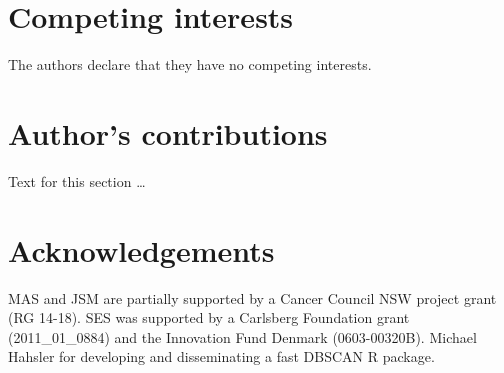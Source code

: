 \documentclass{bmcart}
\begin{document}
\begin{backmatter}

\section*{Competing interests}
  The authors declare that they have no competing interests.

\section*{Author's contributions}
  Text for this section \ldots

\section*{Acknowledgements}
MAS and JSM are partially supported  by a Cancer Council NSW project grant (RG 14-18). 
SES was supported by a Carlsberg Foundation grant (2011\_01\_0884) and the Innovation Fund Denmark (0603-00320B). 
Michael Hahsler for developing and disseminating a fast DBSCAN R package.







\end{backmatter}
\end{document}
